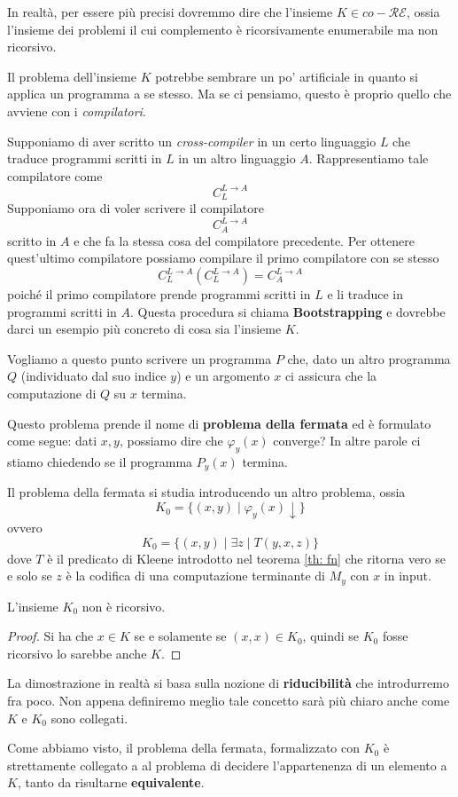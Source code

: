 In realtà, per essere più precisi dovremmo dire che l'insieme
$K \in co-\mathcal{RE}$, ossia l'insieme dei problemi il cui
complemento è ricorsivamente enumerabile ma non ricorsivo.

Il problema dell'insieme $K$ potrebbe sembrare un po' artificiale
in quanto si applica un programma a se stesso. Ma se ci pensiamo,
questo è proprio quello che avviene con i \emph{compilatori}.

Supponiamo di aver scritto un \emph{cross-compiler} in un certo
linguaggio $L$ che traduce programmi scritti in $L$ in un altro
linguaggio $A$. Rappresentiamo tale compilatore come
\[ C_L^{L \rightarrow A} \]
Supponiamo ora di voler scrivere il compilatore
\[ C_A^{L \rightarrow A} \]
scritto in $A$ e che fa la stessa cosa del compilatore
precedente. Per ottenere quest'ultimo compilatore possiamo
compilare il primo compilatore con se stesso
\[
	C_L^{L \rightarrow A} (C_L^{L \rightarrow A}) =
	C_A^{L \rightarrow A}
\]
poiché il primo compilatore prende programmi scritti in $L$ e li
traduce in programmi scritti in $A$. Questa procedura si chiama
\textbf{Bootstrapping} e dovrebbe darci un esempio più concreto
di cosa sia l'insieme $K$.

Vogliamo a questo punto scrivere un programma $P$ che, dato un
altro programma $Q$ (individuato dal suo indice $y$) e un
argomento $x$ ci assicura che la computazione di $Q$ su $x$
termina.

Questo problema prende il nome di \textbf{problema della fermata}
ed è formulato come segue: dati $x, y$, possiamo dire che
$\varphi_y (x)$ converge? In altre parole ci stiamo chiedendo se
il programma $P_y (x)$ termina.

Il problema della fermata si studia introducendo un altro
problema, ossia
\[ K_0 = \{ (x, y) \mid \varphi_y (x) \downarrow \} \]
ovvero
\[ K_0 = \{ (x, y) \mid \exists z \mid T(y,x,z) \} \]
dove $T$ è il predicato di Kleene introdotto nel teorema
\ref{th: fn} che ritorna vero se e solo se $z$ è la codifica di
una computazione terminante di $M_y$ con $x$ in input.

\begin{corollary}
	L'insieme $K_0$ non è ricorsivo.
	\begin{proof}
		Si ha che $x \in K$ se e solamente se $(x, x) \in K_0$,
		quindi se $K_0$ fosse ricorsivo lo sarebbe anche $K$.
	\end{proof}
\end{corollary}

La dimostrazione in realtà si basa sulla nozione di
\textbf{riducibilità} che introdurremo fra poco. Non appena
definiremo meglio tale concetto sarà più chiaro anche come
$K$ e $K_0$ sono collegati.

Come abbiamo visto, il problema della fermata, formalizzato con
$K_0$ è strettamente collegato a al problema di decidere
l'appartenenza di un elemento a $K$, tanto da risultarne
\textbf{equivalente}.